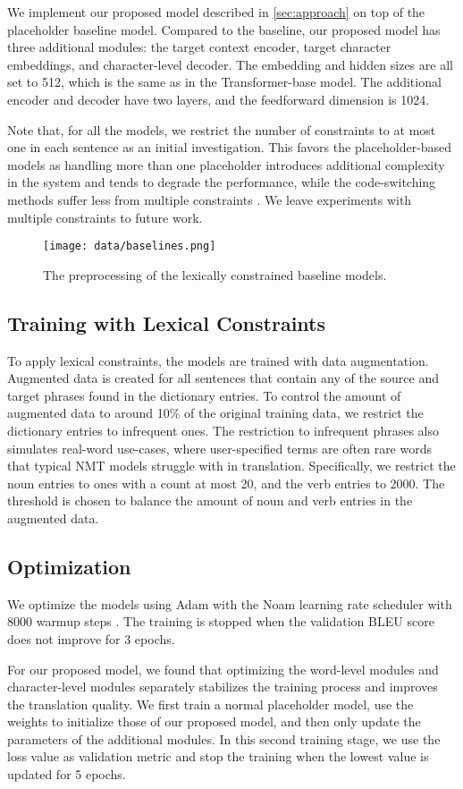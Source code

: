 We implement our proposed model described in \cref{sec:approach} on top of the placeholder baseline model.
Compared to the baseline, our proposed model has three additional modules: the target context encoder, target character embeddings, and character-level decoder.
The embedding and hidden sizes are all set to 512, which is the same as in the Transformer-base model.
The additional encoder and decoder have two layers, and the feedforward dimension is 1024.


Note that, for all the models, we restrict the number of constraints to at most one in each sentence as an initial investigation. This favors the placeholder-based models as handling more than one placeholder introduces additional complexity in the system and tends to degrade the performance, while the code-switching methods suffer less from multiple constraints \citep{song-etal-2019-code}.
We leave experiments with multiple constraints to future work.


\begin{figure}[t]
\centering
\texttt{[image: data/baselines.png]}
\caption{The preprocessing of the lexically constrained baseline models.}
\label{fig:baseline}
\end{figure}



\subsection{Training with Lexical Constraints}
To apply lexical constraints, the models are trained with data augmentation.
Augmented data is created for all sentences that contain any of the source and target phrases found in the dictionary entries.
To control the amount of augmented data to around 10\% of the original training data, we restrict the dictionary entries to infrequent ones.
The restriction to infrequent phrases also simulates real-word use-cases, where user-specified terms are often rare words that typical NMT models struggle with in translation.
Specifically, we restrict the noun entries to ones with a count at most 20, and the verb entries to 2000.
The threshold is chosen to balance the amount of noun and verb entries in the augmented data.


\subsection{Optimization}
We optimize the models using Adam \citep{Kingma2015AdamAM} with the Noam learning rate scheduler with 8000 warmup steps \citep{NIPS2017_3f5ee243}. The training is stopped when the validation BLEU score does not improve for 3 epochs.

For our proposed model, we found that optimizing the word-level modules and character-level modules separately stabilizes the training process and improves the translation quality.
We first train a normal placeholder model, use the weights to initialize those of our proposed model, and then only update the parameters of the additional modules.
In this second training stage, we use the loss value as validation metric and stop the training when the lowest value is updated for 5 epochs.
